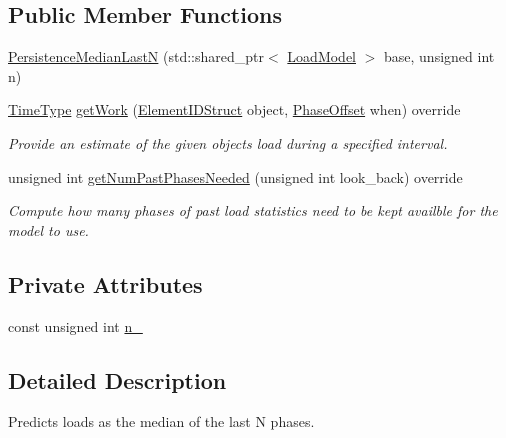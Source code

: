 \subsection*{Public Member Functions}
\begin{DoxyCompactItemize}
\item 
\hyperlink{structvt_1_1vrt_1_1collection_1_1balance_1_1_persistence_median_last_n_afeb915b217785638e82918d6f2b23d8b}{Persistence\+Median\+LastN} (std\+::shared\+\_\+ptr$<$ \hyperlink{classvt_1_1vrt_1_1collection_1_1balance_1_1_load_model}{Load\+Model} $>$ base, unsigned int n)
\item 
\hyperlink{namespacevt_a876a9d0cd5a952859c72de8a46881442}{Time\+Type} \hyperlink{structvt_1_1vrt_1_1collection_1_1balance_1_1_persistence_median_last_n_a905b84cb14c5326bdce4b761e4fd3106}{get\+Work} (\hyperlink{structvt_1_1vrt_1_1collection_1_1balance_1_1_element_i_d_struct}{Element\+I\+D\+Struct} object, \hyperlink{structvt_1_1vrt_1_1collection_1_1balance_1_1_phase_offset}{Phase\+Offset} when) override
\begin{DoxyCompactList}\small\item\em Provide an estimate of the given object\textquotesingle{}s load during a specified interval. \end{DoxyCompactList}\item 
unsigned int \hyperlink{structvt_1_1vrt_1_1collection_1_1balance_1_1_persistence_median_last_n_accad4d2fe2cc3701966e13bbb5dd793c}{get\+Num\+Past\+Phases\+Needed} (unsigned int look\+\_\+back) override
\begin{DoxyCompactList}\small\item\em Compute how many phases of past load statistics need to be kept availble for the model to use. \end{DoxyCompactList}\end{DoxyCompactItemize}
\subsection*{Private Attributes}
\begin{DoxyCompactItemize}
\item 
const unsigned int \hyperlink{structvt_1_1vrt_1_1collection_1_1balance_1_1_persistence_median_last_n_aa800c86e610ba7b4ff0ddf0c91210136}{n\+\_\+}
\end{DoxyCompactItemize}


\subsection{Detailed Description}
Predicts loads as the median of the last N phases. 

